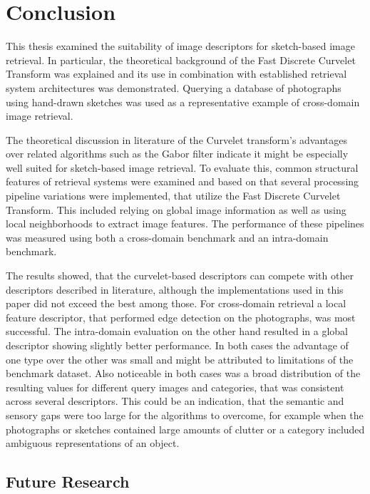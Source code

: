 \chapter{Conclusion}\label{ch:conclusion}

This thesis examined the suitability of image descriptors for sketch-based
image retrieval. In particular, the theoretical background of the Fast Discrete
Curvelet Transform was explained and its use in combination with established
retrieval system architectures was demonstrated. Querying a database of
photographs using hand-drawn sketches was used as a representative example of
cross-domain image retrieval.

The theoretical discussion in literature of the Curvelet transform's advantages
over related algorithms such as the Gabor filter indicate it might be
especially well suited for sketch-based image retrieval. To evaluate this,
common structural features of retrieval systems were examined and based on that
several processing pipeline variations were implemented, that utilize the Fast
Discrete Curvelet Transform. This included relying on global image information
as well as using local neighborhoods to extract image features. The performance
of these pipelines was measured using both a cross-domain benchmark and an
intra-domain benchmark.

The results showed, that the curvelet-based descriptors can compete with other
descriptors described in literature, although the implementations used in this
paper did not exceed the best among those. For cross-domain retrieval a local
feature descriptor, that performed edge detection on the photographs, was most
successful. The intra-domain evaluation on the other hand resulted in a global
descriptor showing slightly better performance. In both cases the advantage of
one type over the other was small and might be attributed to limitations of the
benchmark dataset. Also noticeable in both cases was a broad distribution of
the resulting values for different query images and categories, that was
consistent across several descriptors. This could be an indication, that the
semantic and sensory gaps were too large for the algorithms to overcome, for
example when the photographs or sketches contained large amounts of clutter or
a category included ambiguous representations of an object.

\section{Future Research}\label{sec:conclusion_future_research}

